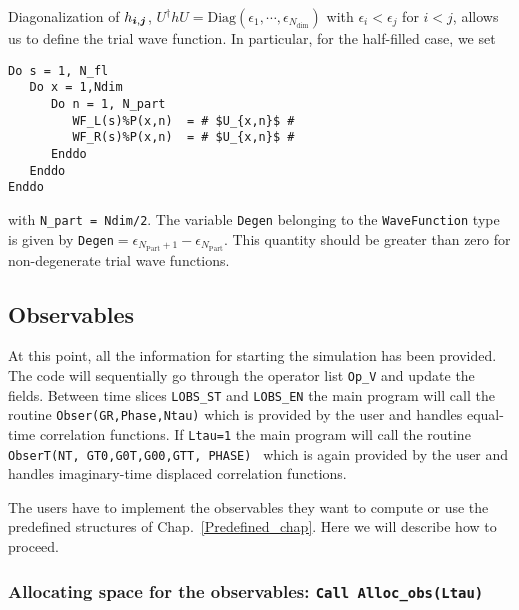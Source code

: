 Diagonalization  of  $ h_{\boldsymbol{i},\boldsymbol{j}}$,      $U^{\dagger} h  U  = \mathrm{Diag} \left(   \epsilon_1, \cdots, \epsilon_{N_{\mathrm{dim}}} \right) $     with  $\epsilon_i  <  \epsilon_j $  for $i < j$, allows us  to define the  trial wave function.  In particular, for the half-filled case, we set 
\begin{lstlisting}[style=fortran,escapechar=\#]
Do s = 1, N_fl
   Do x = 1,Ndim
      Do n = 1, N_part
         WF_L(s)%P(x,n)  = # $U_{x,n}$ #
         WF_R(s)%P(x,n)  = # $U_{x,n}$ #
      Enddo
   Enddo
Enddo
\end{lstlisting}
with \texttt{N\_part = Ndim/2}.     The  variable \texttt{Degen}   belonging to the \texttt{WaveFunction}  type  is given by  \texttt{Degen}$=\epsilon_{N_{\mathrm{Part}} +1 } - \epsilon_{N_{\mathrm{Part}}  }$.   This quantity should be greater than zero  for non-degenerate trial wave functions. 

\subsection{Observables}

At this point, all the information for starting the simulation has been provided.  The code will sequentially go through  the operator list  \texttt{Op\_V}  and update the  fields.   Between  time slices   \texttt{LOBS\_ST}  and  \texttt{LOBS\_EN}   the main program will call the routine  \texttt{Obser(GR,Phase,Ntau)}   which is provided by the user and handles equal-time correlation functions. 
If \texttt{Ltau=1} the main program will call the routine \texttt{ObserT(NT,  GT0,G0T,G00,GTT, PHASE) }   which is again  provided by the user and handles  imaginary-time displaced correlation functions. 

The users have to implement the observables they want to compute or use the predefined structures of Chap.~\ref{Predefined_chap}. Here  we  will describe how to  proceed. 

\subsubsection{Allocating space for the observables: \texttt{Call Alloc\_obs(Ltau) }} \label{Alloc_obs_sec}

